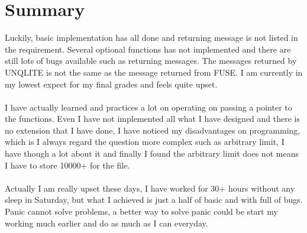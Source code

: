 \documentclass[legalpaper]{article}
\begin{document}
	\section{Summary}
	Luckily, basic implementation has all done and returning message is not listed in the requirement. Several optional functions has not implemented and there are still lots of bugs available such as returning messages. The messages returned by UNQLITE is not the same as the message returned from FUSE. I am currently in my lowest expect for my final grades and feels quite upset.\\\\
	I have actually learned and practices a lot on operating on passing a pointer to the functions. Even I have not implemented all what I have designed and there is no extension that I have done, I have noticed my disadvantages on programming, which is I always regard the question more complex such as arbitrary limit, I have though a lot about it and finally I found the arbitrary limit does not means I have to store 10000+ for the file.\\\\
	Actually I am really upset these days, I have worked for 30+ hours without any sleep in Saturday, but what I achieved is just a half of basic and with full of bugs. Panic cannot solve problems, a better way to solve panic could be start my working much earlier and do as much as I can everyday.
\end{document}
